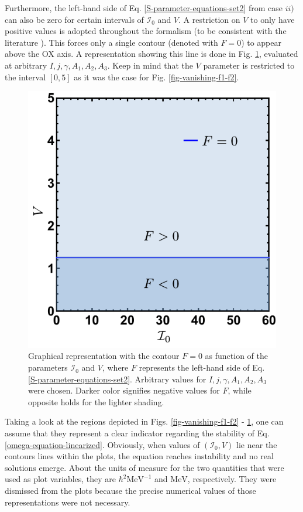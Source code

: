 Furthermore, the left-hand side of Eq. \ref{S-parameter-equations-set2} from case $ii)$ can also be zero for certain intervals of $\mathcal{I}_0$ and $V$. A restriction on $V$ to only have positive values is adopted throughout the formalism (to be consistent with the literature \cite{shou2009coupling,tanabe2017stability,poenaru2021parity}). This forces only a single contour (denoted with $F=0$) to appear above the OX axis. A representation showing this line is done in Fig. \ref{fig-vanishing-F}, evaluated at arbitrary $I, j, \gamma, A_1, A_2, A_3$. Keep in mind that the $V$ parameter is restricted to the interval $[0,5]$ as it was the case for Fig. \ref{fig-vanishing-f1-f2}.
\begin{figure}
    \centering
    \includegraphics[scale=0.8]{Chapters/Figures/F_solutions_B-term.pdf}
    \caption{Graphical representation with the contour $F=0$ as function of the parameters $\mathcal{I}_0$ and $V$, where $F$ represents the left-hand side of Eq. \ref{S-parameter-equations-set2}. Arbitrary values for $I, j, \gamma, A_1, A_2, A_3$ were chosen. Darker color signifies negative values for $F$, while opposite holds for the lighter shading.}
    \label{fig-vanishing-F}
\end{figure}

Taking a look at the regions depicted in Figs. \ref{fig-vanishing-f1-f2} - \ref{fig-vanishing-F}, one can assume that they represent a clear indicator regarding the stability of Eq. \ref{omega-equation-linearized}. Obviously, when values of $(\mathcal{I}_0,V)$ lie near the contours lines within the plots, the equation reaches instability and no real solutions emerge. About the units of measure for the two quantities that were used as plot variables, they are $\hbar^2\text{MeV}^{-1}$ and $\text{MeV}$, respectively. They were dismissed from the plots because the precise numerical values of those representations were not necessary.

